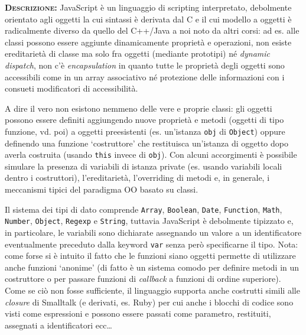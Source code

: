
\begin{description}
	\item{\scshape\bfseries Descrizione:}
  JavaScript è un linguaggio di scripting interpretato, debolmente orientato agli oggetti la cui sintassi è derivata dal C e il cui modello a oggetti è radicalmente diverso da quello  del C++/Java a noi noto da altri corsi: ad es. alle classi possono essere aggiunte dinamicamente proprietà e operazioni, non esiste ereditarietà di classe ma solo fra oggetti (mediante prototipi) né \textit{dynamic dispatch}, non c'è \textit{encapsulation} in quanto tutte le proprietà degli oggetti sono accessibili come in un array associativo né protezione delle informazioni con i consueti modificatori di accessibilità.
  
  A dire il vero non esistono nemmeno delle vere e proprie classi: gli oggetti possono essere definiti aggiungendo nuove proprietà e metodi (oggetti di tipo funzione, vd. poi) a oggetti preesistenti (es. un'istanza \texttt{obj} di \texttt{Object}) oppure definendo una funzione `costruttore' che restituisca un'istanza di oggetto dopo averla costruita (usando \texttt{this} invece di \texttt{obj}). Con alcuni accorgimenti è possibile simulare la presenza di variabili di istanza private (es. usando variabili locali dentro i costruttori), l'ereditarietà, l'overriding di metodi e, in generale, i meccanismi tipici del paradigma OO basato su classi.
  
  Il sistema dei tipi di dato comprende \texttt{Array}, \texttt{Boolean}, \texttt{Date}, \texttt{Function}, \texttt{Math}, \texttt{Number}, \texttt{Object}, \texttt{Regexp} e \texttt{String}, tuttavia JavaScript è debolmente tipizzato e, in particolare, le variabili sono dichiarate assegnando un valore a un identificatore eventualmente preceduto dalla keyword \texttt{var} senza però specificarne il tipo. Nota: come forse si è intuito il fatto che le funzioni siano oggetti permette di utilizzare anche funzioni `anonime' (di fatto è un sistema comodo per definire metodi in un costruttore o per passare funzioni di \textit{callback} a funzioni di ordine superiore). Come se ciò non fosse sufficiente, il linguaggio supporta anche costrutti simili alle \textit{closure} di Smalltalk (e derivati, es. Ruby) per cui anche i blocchi di codice sono visti come espressioni e possono essere passati come parametro, restituiti, assegnati a identificatori ecc\dots  
  

\end{description}
